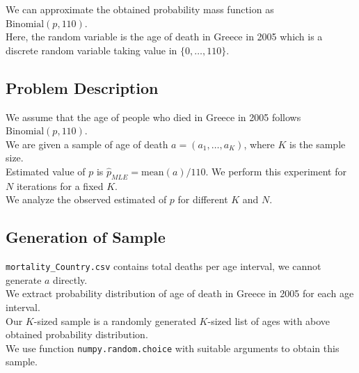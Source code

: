 \documentclass[fleqn, 11pt]{article}
\begin{document}
We can approximate the obtained probability mass function as $\mathrm{Binomial}(p, 110)$. \\
Here, the random variable is the age of death in Greece in 2005 which is a discrete random variable taking value in $\{0, \dots, 110\}$. \\

\subsection{Problem Description}
We assume that the age of people who died in Greece in 2005 follows $\mathrm{Binomial}(p, 110)$. \\
We are given a sample of age of death $a = (a_1, \dots, a_K)$, where $K$ is the sample size. \\
Estimated value of $p$ is $\hat{p}_{MLE} = \mathrm{mean}(a) / 110$.
We perform this experiment for $N$ iterations for a fixed $K$. \\
We analyze the observed estimated of $p$ for different $K$ and $N$. \\

\subsection{Generation of Sample}
\verb!mortality_Country.csv! contains total deaths per age interval, we cannot generate $a$ directly. \\
We extract probability distribution of age of death in Greece in 2005 for each age interval. \\
Our $K$-sized sample is a randomly generated $K$-sized list of ages with above obtained probability distribution. \\
We use function \verb!numpy.random.choice! with suitable arguments to obtain this sample. \\
\end{document}
